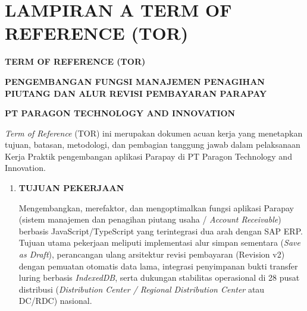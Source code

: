 \clearpage
\section*{LAMPIRAN A TERM OF REFERENCE (TOR)}

\begin{framed}
\begin{center}
{\bfseries\Large TERM OF REFERENCE (TOR)\par}
{\bfseries\large PENGEMBANGAN FUNGSI MANAJEMEN PENAGIHAN PIUTANG DAN ALUR REVISI PEMBAYARAN PARAPAY\par}
\vspace{0.2cm}
\textbf{PT PARAGON TECHNOLOGY AND INNOVATION}
\end{center}
\vspace{0.3cm}

\textit{Term of Reference} (TOR) ini merupakan dokumen acuan kerja yang menetapkan tujuan, batasan, metodologi, dan pembagian tanggung jawab dalam pelaksanaan Kerja Praktik pengembangan aplikasi Parapay di PT Paragon Technology and Innovation.

\begin{enumerate}[label=\arabic*.,leftmargin=0.8cm,itemsep=8pt,topsep=4pt,parsep=0pt,partopsep=0pt]
\item \textbf{TUJUAN PEKERJAAN}\par\vspace{2pt}
  Mengembangkan, merefaktor, dan mengoptimalkan fungsi aplikasi Parapay (sistem manajemen dan penagihan piutang usaha / \textit{Account Receivable}) berbasis JavaScript/TypeScript yang terintegrasi dua arah dengan SAP ERP. Tujuan utama pekerjaan meliputi implementasi alur simpan sementara (\textit{Save as Draft}), perancangan ulang arsitektur revisi pembayaran (Revision v2) dengan pemuatan otomatis data lama, integrasi penyimpanan bukti transfer luring berbasis \textit{IndexedDB}, serta dukungan stabilitas operasional di 28 pusat distribusi (\textit{Distribution Center / Regional Distribution Center} atau DC/RDC) nasional.


\end{enumerate}
\end{framed}
